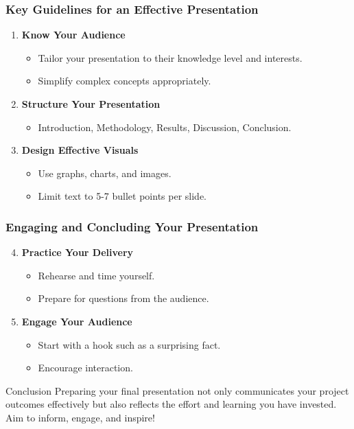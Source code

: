 \documentclass[aspectratio=169]{beamer}
\begin{document}
\begin{frame}[fragile]
    \frametitle{Key Guidelines for an Effective Presentation}
    \begin{enumerate}
        \item \textbf{Know Your Audience}
            \begin{itemize}
                \item Tailor your presentation to their knowledge level and interests.
                \item Simplify complex concepts appropriately.
            \end{itemize}
        \item \textbf{Structure Your Presentation}
            \begin{itemize}
                \item Introduction, Methodology, Results, Discussion, Conclusion.
            \end{itemize}
        \item \textbf{Design Effective Visuals}
            \begin{itemize}
                \item Use graphs, charts, and images.
                \item Limit text to 5-7 bullet points per slide.
            \end{itemize}
    \end{enumerate}
\end{frame}

\begin{frame}[fragile]
    \frametitle{Engaging and Concluding Your Presentation}
    \begin{enumerate}
        \setcounter{enumi}{3}
        \item \textbf{Practice Your Delivery}
            \begin{itemize}
                \item Rehearse and time yourself.
                \item Prepare for questions from the audience.
            \end{itemize}
        \item \textbf{Engage Your Audience}
            \begin{itemize}
                \item Start with a hook such as a surprising fact.
                \item Encourage interaction.
            \end{itemize}
    \end{enumerate}
    \begin{block}{Conclusion}
        Preparing your final presentation not only communicates your project outcomes 
        effectively but also reflects the effort and learning you have invested. 
        Aim to inform, engage, and inspire!
    \end{block}
\end{frame}
\end{document}
